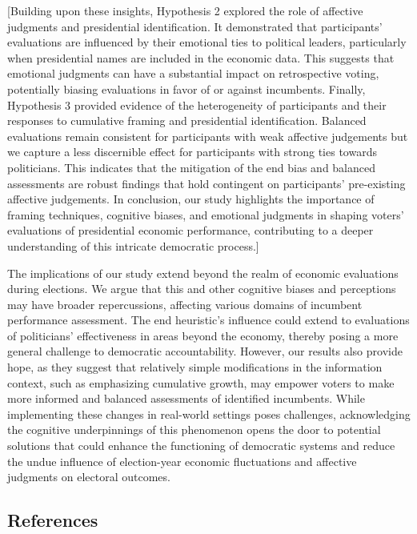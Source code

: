 \documentclass[
]{article}
\begin{document}
{[}Building upon these insights, Hypothesis 2 explored the role of
affective judgments and presidential identification. It demonstrated
that participants' evaluations are influenced by their emotional ties to
political leaders, particularly when presidential names are included in
the economic data. This suggests that emotional judgments can have a
substantial impact on retrospective voting, potentially biasing
evaluations in favor of or against incumbents. Finally, Hypothesis 3
provided evidence of the heterogeneity of participants and their
responses to cumulative framing and presidential identification.
Balanced evaluations remain consistent for participants with weak
affective judgements but we capture a less discernible effect for
participants with strong ties towards politicians. This indicates that
the mitigation of the end bias and balanced assessments are robust
findings that hold contingent on participants' pre-existing affective
judgements. In conclusion, our study highlights the importance of
framing techniques, cognitive biases, and emotional judgments in shaping
voters' evaluations of presidential economic performance, contributing
to a deeper understanding of this intricate democratic process.{]}

The implications of our study extend beyond the realm of economic
evaluations during elections. We argue that this and other cognitive
biases and perceptions may have broader repercussions, affecting various
domains of incumbent performance assessment. The end heuristic's
influence could extend to evaluations of politicians' effectiveness in
areas beyond the economy, thereby posing a more general challenge to
democratic accountability. However, our results also provide hope, as
they suggest that relatively simple modifications in the information
context, such as emphasizing cumulative growth, may empower voters to
make more informed and balanced assessments of identified incumbents.
While implementing these changes in real-world settings poses
challenges, acknowledging the cognitive underpinnings of this phenomenon
opens the door to potential solutions that could enhance the functioning
of democratic systems and reduce the undue influence of election-year
economic fluctuations and affective judgments on electoral outcomes.

\singlespacing

\hypertarget{references}{%
\subsection{References}\label{references}}
\end{document}
